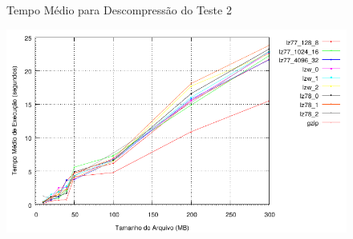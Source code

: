 \documentclass[]{article}
\begin{document}
\begin{figure}
	{\centering Tempo Médio para Descompressão do Teste 2\par}
	\includegraphics{images/binario_descompressao}
\caption{}
\label{fig:e8}
\end{figure}
\end{document}
